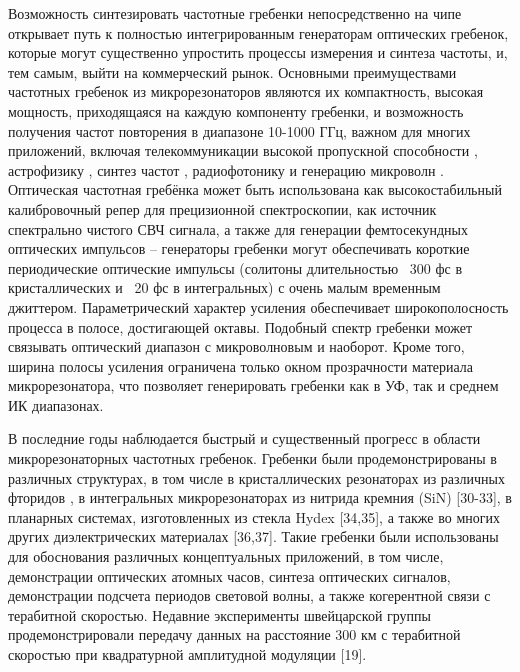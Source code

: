 Возможность синтезировать частотные гребенки непосредственно на чипе открывает путь к полностью интегрированным генераторам оптических гребенок, которые могут существенно упростить процессы измерения и синтеза частоты, и, тем самым, выйти на коммерческий рынок. Основными преимуществами частотных гребенок из микрорезонаторов являются их компактность, высокая мощность, приходящаяся на каждую компоненту гребенки, и возможность получения частот повторения в диапазоне 10-1000 ГГц, важном для многих приложений, включая телекоммуникации высокой пропускной способности \cite{Pfeifle2014}, астрофизику \cite{Glenday2015}, синтез частот \cite{Ferdous2011}, радиофотонику и генерацию микроволн \cite{Xue2016,Savchenkov2008}. Оптическая частотная гребёнка может быть использована как высокостабильный калибровочный репер для прецизионной спектроскопии, как источник спектрально чистого СВЧ сигнала, а также для генерации фемтосекундных оптических импульсов – генераторы гребенки могут обеспечивать короткие периодические оптические импульсы (солитоны длительностью ~300 фс в кристаллических и ~20 фс в интегральных) с очень малым временным джиттером. Параметрический характер усиления обеспечивает широкополосность процесса в полосе, достигающей октавы. Подобный спектр гребенки может связывать оптический диапазон с микроволновым и наоборот. Кроме того, ширина полосы усиления ограничена только окном прозрачности материала микрорезонатора, что позволяет генерировать гребенки как в УФ, так и среднем ИК диапазонах.


В последние годы наблюдается быстрый и существенный прогресс в области микрорезонаторных частотных гребенок. Гребенки были продемонстрированы в различных структурах, в том числе в кристаллических резонаторах из различных фторидов \cite{Savchenkov2008,Grudinin2012,Jost2015,Liang2011,DelHaye2011,Chembo2010,Grudinin2009}, в интегральных микрорезонаторах из нитрида кремния (SiN) [30-33], в планарных системах, изготовленных из стекла Hydex [34,35], а также во многих других диэлектрических материалах [36,37]. Такие гребенки были использованы для обоснования различных концептуальных приложений, в том числе, демонстрации оптических атомных часов, синтеза оптических сигналов, демонстрации подсчета периодов световой волны, а также когерентной связи с терабитной скоростью. Недавние эксперименты швейцарской группы продемонстрировали передачу данных на расстояние 300 км с терабитной скоростью при квадратурной амплитудной модуляции [19].


